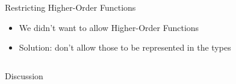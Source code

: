 \documentclass[department=icis, slidenumbers=slide, official=true]{beamerruhuisstijl}
\begin{document}
\begin{frame}{Restricting Higher-Order Functions}
    \begin{itemize}
        \item We didn't want to allow Higher-Order Functions
        \pause{}
        \item Solution: don't allow those to be represented in the types
    \end{itemize}

    \pause{}
    \inputminted{Haskell}{ex4.hs}
\end{frame}

\begin{frame}{Discussion}
    \inputminted{clean}{what_does_a_mean.spl}
\end{frame}
\end{document}
